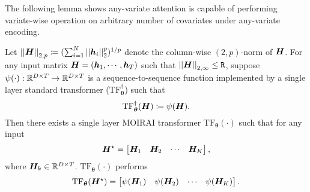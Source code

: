 The following lemma shows any-variate attention is capable of performing variate-wise operation on arbitrary number of covariates under any-variate encoding.

\begin{lemma}\label{lem:moirai-group-wise}

    Let $\left\lvert \left\lvert\bm{H}\right\rvert \right\rvert_{2,p} \coloneqq ( \sum_{i=1}^N \left\lvert \left\lvert\bm{h}_i\right\rvert \right\rvert_2^p )^{1/p}$ denote the column-wise $(2, p)$-norm of $\bm{H}$.
    For any input matrix $\bm{H} = (\bm{h}_1, \cdots, \bm{h}_T)$ such that $\left\lvert \left\lvert\bm{H}\right\rvert \right\rvert_{2, \infty} \leq \mathtt{R}$,
    suppose
    $\psi(\cdot): \mathbb{R}^{D \times T} \rightarrow \mathbb{R}^{D \times T}$ is a sequence-to-sequence function implemented by a single layer standard transformer ($\text{TF}_{\bm{\theta}}^\dagger$) such that 
    \[
    \text{TF}_{\bm{\theta}}^\dagger(\bm{H})
    \coloneqq
        \psi(\bm{H}).
    \]
    Then there exists a single layer MOIRAI transformer $\text{TF}_{\bm{\theta}}(\cdot)$ such that for any input 
    \[
    \bm{H}^\star
    =
    \begin{bmatrix}
        \bm{H}_1 & \bm{H}_2 & \cdots & \bm{H}_K
    \end{bmatrix},
    \]
    where $\bm{H}_k \in \mathbb{R}^{D \times T}$.
    $\text{TF}_{\bm{\theta}}(\cdot)$ performs
    \[
    \text{TF}_{\bm{\theta}}
    (\bm{H}^\star)
    =
    \begin{bmatrix}
     \psi(\bm{H}_1) & \psi(\bm{H}_2) & \cdots & \psi(\bm{H}_K)   
    \end{bmatrix}.
    \]
\end{lemma}

